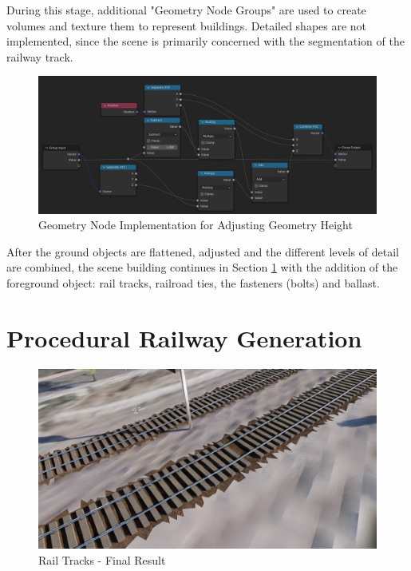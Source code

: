 During this stage, additional "Geometry Node Groups" are used to create volumes and texture them to represent buildings. Detailed shapes are not implemented, since the scene is primarily concerned with the segmentation of the railway track.

\begin{figure}[H]
    \centering
    \includegraphics[width=14.5cm]{src/img/pic/pic-4 blender geometry node screenshot adjust_z_to_match_pos.jpg}
    \caption{Geometry Node Implementation for Adjusting Geometry Height}
    \label{fig:impl-adjust-z-to-match-pos}
\end{figure}

After the ground objects are flattened, adjusted and the different levels of detail are combined, the scene building continues in Section \ref{sec:procedural-railway-generation} with the addition of the foreground object: rail tracks, railroad ties, the fasteners (bolts) and ballast.


\section{Procedural Railway Generation}
\label{sec:procedural-railway-generation}


\begin{figure}[H]
    \centering
    \includegraphics[width=.95\textwidth]{src/img/procedural-tracks/3b-rails-result.jpg}
    \caption{Rail Tracks - Final Result}
    \label{fig:track-final-result}
\end{figure}

